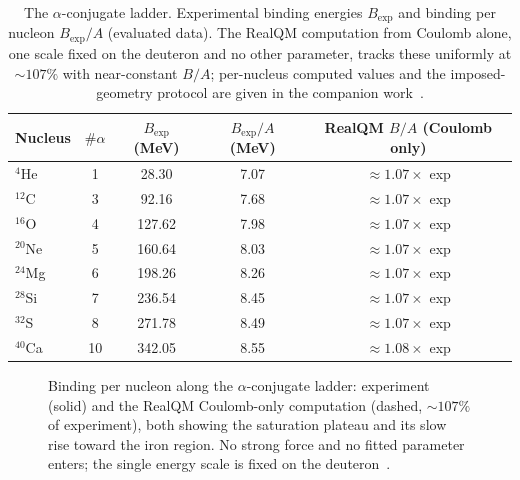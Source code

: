 \documentclass[11pt]{article}
\begin{document}
\begin{table}[h]
\centering
\renewcommand{\arraystretch}{1.15}
\begin{tabular}{lcccc}
\toprule
Nucleus & $\#\alpha$ & $B_{\exp}$ (MeV) & $B_{\exp}/A$ (MeV) & RealQM $B/A$ (Coulomb only)\\
\midrule
$^{4}$He   & 1 & 28.30  & 7.07 & $\approx 1.07\times$ exp\\
$^{12}$C   & 3 & 92.16  & 7.68 & $\approx 1.07\times$ exp\\
$^{16}$O   & 4 & 127.62 & 7.98 & $\approx 1.07\times$ exp\\
$^{20}$Ne  & 5 & 160.64 & 8.03 & $\approx 1.07\times$ exp\\
$^{24}$Mg  & 6 & 198.26 & 8.26 & $\approx 1.07\times$ exp\\
$^{28}$Si  & 7 & 236.54 & 8.45 & $\approx 1.07\times$ exp\\
$^{32}$S   & 8 & 271.78 & 8.49 & $\approx 1.07\times$ exp\\
$^{40}$Ca  &10 & 342.05 & 8.55 & $\approx 1.08\times$ exp\\
\bottomrule
\end{tabular}
\caption{The $\alpha$-conjugate ladder. Experimental binding energies $B_{\exp}$ and binding per
nucleon $B_{\exp}/A$ (evaluated data). The RealQM computation from Coulomb alone, one scale fixed on
the deuteron and no other parameter, tracks these uniformly at $\sim\!107\%$ with near-constant $B/A$;
per-nucleus computed values and the imposed-geometry protocol are given in the companion
work~\cite{Johnson-RealNucleus}.}
\label{tab:ladder}
\end{table}

\begin{figure}[h]
\centering
{}
\caption{Binding per nucleon along the $\alpha$-conjugate ladder: experiment (solid) and the RealQM
Coulomb-only computation (dashed, $\sim\!107\%$ of experiment), both showing the saturation plateau
and its slow rise toward the iron region. No strong force and no fitted parameter enters; the single
energy scale is fixed on the deuteron~\cite{Johnson-RealNucleus}.}
\label{fig:bpa}
\end{figure}
\end{document}
